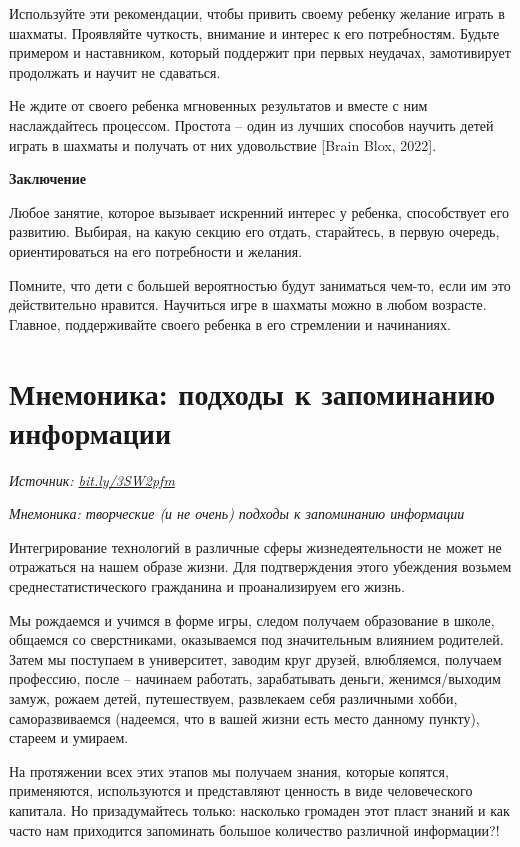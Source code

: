 Используйте эти рекомендации, чтобы привить своему ребенку желание играть в шахматы. Проявляйте чуткость, внимание и интерес к его потребностям. Будьте примером и наставником, который поддержит при первых неудачах, замотивирует продолжать и научит не сдаваться.

Не ждите от своего ребенка мгновенных результатов и вместе с ним наслаждайтесь процессом.  Простота – один из лучших способов научить детей играть в шахматы и получать от них удовольствие [Brain Blox, 2022].

\textbf{Заключение}

Любое занятие, которое вызывает искренний интерес у ребенка, способствует его развитию. Выбирая, на какую секцию его отдать, старайтесь, в первую очередь, ориентироваться на его потребности и желания.

Помните, что дети с большей вероятностью будут заниматься чем-то, если им это действительно нравится. Научиться игре в шахматы можно в любом возрасте. Главное, поддерживайте своего ребенка в его стремлении и начинаниях.

\newpage
\section{Мнемоника: подходы к запоминанию информации}

\textit{Источник: \url{bit.ly/3SW2pfm}}


\textit{Мнемоника: творческие (и не очень) подходы к запоминанию информации}

Интегрирование технологий в различные сферы жизнедеятельности не может не отражаться на нашем образе жизни. Для подтверждения этого убеждения возьмем среднестатистического гражданина и проанализируем его жизнь.

Мы рождаемся и учимся в форме игры, следом получаем образование в школе, общаемся со сверстниками, оказываемся под значительным влиянием родителей. Затем мы поступаем в университет, заводим круг друзей, влюбляемся, получаем профессию, после – начинаем работать, зарабатывать деньги, женимся/выходим замуж, рожаем детей, путешествуем, развлекаем себя различными хобби, саморазвиваемся (надеемся, что в вашей жизни есть место данному пункту), стареем и умираем.

На протяжении всех этих этапов мы получаем знания, которые копятся, применяются, используются и представляют ценность в виде человеческого капитала. Но призадумайтесь только: насколько громаден этот пласт знаний и как часто нам приходится запоминать большое количество различной информации?!

